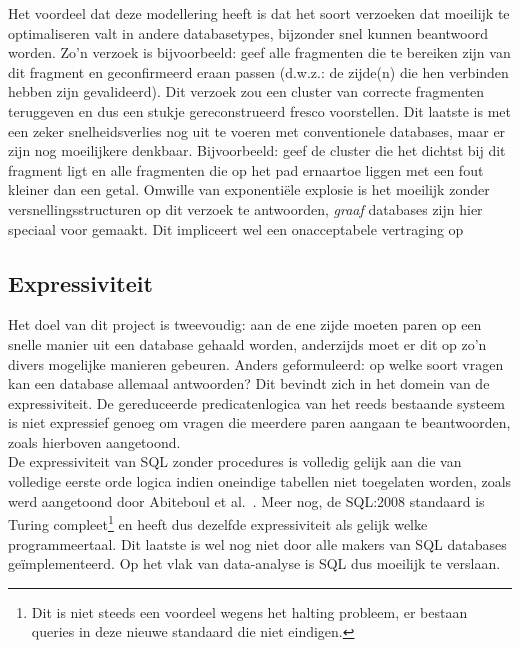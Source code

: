 Het voordeel dat deze modellering heeft is dat het soort verzoeken dat moeilijk te optimaliseren valt in andere databasetypes, bijzonder snel kunnen beantwoord worden. Zo'n verzoek is bijvoorbeeld: geef alle fragmenten die te bereiken zijn van dit fragment en geconfirmeerd eraan passen (d.w.z.: de zijde(n) die hen verbinden hebben zijn gevalideerd). Dit verzoek zou een cluster van correcte fragmenten teruggeven en dus een stukje gereconstrueerd fresco voorstellen. Dit laatste is met een zeker snelheidsverlies nog uit te voeren met conventionele databases, maar er zijn nog moeilijkere denkbaar. Bijvoorbeeld: geef de cluster die het dichtst bij dit fragment ligt en alle fragmenten die op het pad ernaartoe liggen met een fout kleiner dan een getal. Omwille van exponenti\"ele explosie is het moeilijk zonder versnellingsstructuren op dit verzoek te antwoorden, \emph{graaf} databases zijn hier speciaal voor gemaakt. Dit impliceert wel een onacceptabele vertraging op 

\subsection{Expressiviteit}
Het doel van dit project is tweevoudig: aan de ene zijde moeten paren op een snelle manier uit een database gehaald worden, anderzijds moet er dit op zo'n divers mogelijke manieren gebeuren. Anders geformuleerd: op welke soort vragen kan een database allemaal antwoorden? Dit bevindt zich in het domein van de expressiviteit. De gereduceerde predicatenlogica van het reeds bestaande systeem is niet expressief genoeg om vragen die meerdere paren aangaan te beantwoorden, zoals hierboven aangetoond.\\

De expressiviteit van SQL zonder procedures is volledig gelijk aan die van volledige eerste orde logica indien oneindige tabellen niet toegelaten worden, zoals werd aangetoond door Abiteboul et al.~\cite{Abiteboul95}. Meer nog, de SQL:2008 standaard is Turing compleet\footnote{Dit is niet steeds een voordeel wegens het halting probleem, er bestaan queries in deze nieuwe standaard die niet eindigen.} en heeft dus dezelfde expressiviteit als gelijk welke programmeertaal. Dit laatste is wel nog niet door alle makers van SQL databases ge\"implementeerd. Op het vlak van data-analyse is SQL dus moeilijk te verslaan.\\


